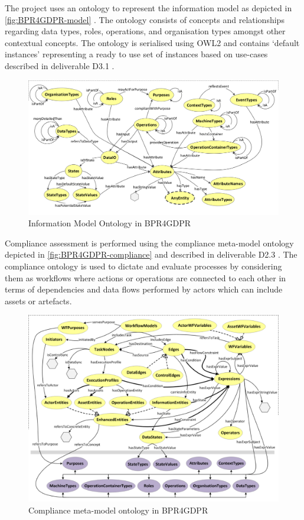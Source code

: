 The project uses an ontology to represent the information model as depicted in \autoref{fig:BPR4GDPR-model} \cite{lioudakis_d3.1_2019}. The ontology consists of concepts and relationships regarding data types, roles, operations, and organisation types amongst other contextual concepts.
The ontology is serialised using OWL2 and contains `default instances'
representing a ready to use set of instances based on use-cases described in deliverable D3.1 \cite{lioudakis_d3.1_2019}. 
\begin{figure}[htbp]
    \centering
    \includegraphics[width=0.8\linewidth]{img/BPR4GDPR_model.png}
    \caption{Information Model Ontology in BPR4GDPR \cite{lioudakis_d3.1_2019}}
    \label{fig:BPR4GDPR-model}
\end{figure}

Compliance assessment is performed using the compliance meta-model
ontology depicted in \autoref{fig:BPR4GDPR-compliance} and described
in deliverable D2.3 \cite{dellas_d2.3_2019}. The compliance ontology
is used to dictate and evaluate processes by considering them as
workflows where actions or operations are connected to each other in
terms of dependencies and data flows performed by actors which can include assets or artefacts.
\begin{figure}[htbp]
    \centering
    \includegraphics[width=0.8\linewidth]{img/BPR4GDPR_compliance.png}
    \caption{Compliance meta-model ontology in BPR4GDPR \cite{dellas_d2.3_2019}}
    \label{fig:BPR4GDPR-compliance}
\end{figure}

